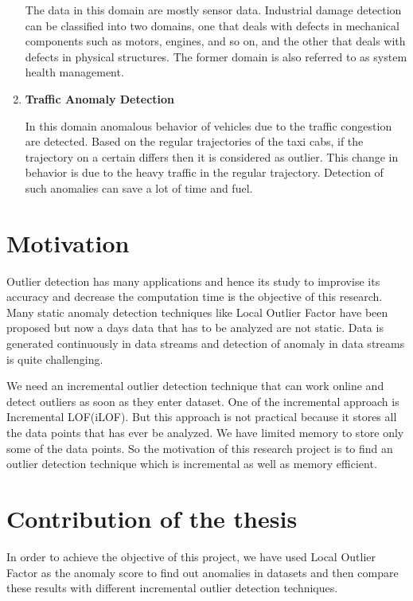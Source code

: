 \begin{enumerate}
The data in this domain are mostly sensor data. Industrial damage detection
can be classified into two domains, one that deals with defects in mechanical
components such as motors, engines, and so on, and the other that deals with defects
in physical structures. The former domain is also referred to as system health
management.


\item \textbf{Traffic Anomaly Detection}\

In this  domain 
anomalous behavior of vehicles due to the traffic congestion are detected. Based on the regular trajectories of the taxi cabs, if the trajectory on a certain differs then it is considered as outlier. This change in behavior is due to the heavy traffic in the regular trajectory. Detection of such anomalies can save a lot of time and fuel.   

\end{enumerate}



 
	
\section{Motivation}
Outlier detection has many applications and hence its study to improvise its accuracy and decrease the computation time is the objective of this research. Many static anomaly detection techniques like Local Outlier Factor have been proposed but now a days data that has to be analyzed are not static. Data is generated continuously in data streams and detection of anomaly in data streams is quite challenging. 

\par

We need an incremental outlier detection technique that can work online and detect outliers as soon as they enter dataset. One of the incremental approach is Incremental LOF(iLOF). But this approach is not practical because it stores all the data points that has ever be analyzed. We have limited memory to store only some of the data points. So the motivation of this research project is to find an outlier detection technique which is incremental as well as memory efficient.  

	
	
	
\section{Contribution of the thesis}
In order to achieve the objective of this project, we have used Local Outlier Factor as the anomaly score to find out anomalies in datasets and then compare these results with different incremental outlier detection techniques. 

